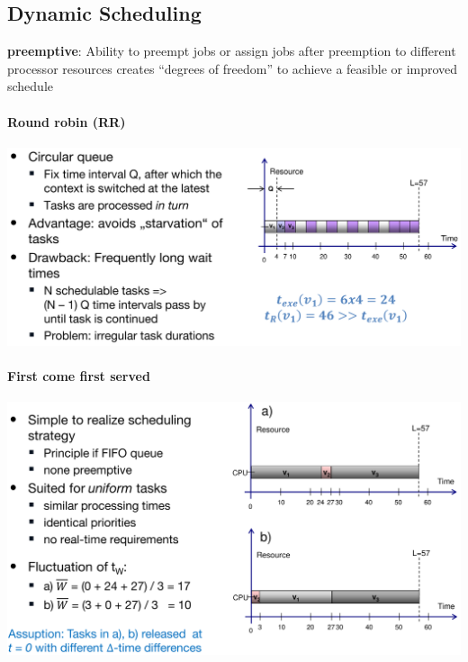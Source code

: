 \documentclass[english]{latex4ei/latex4ei_sheet}
\begin{document}
\subsection{Dynamic Scheduling}

\textbf{preemptive}: Ability to preempt jobs or assign jobs after preemption to different processor resources creates “degrees of freedom” to achieve a feasible or improved schedule

\paragraph{Round robin (RR)}

\begin{center}
  \centering
  \includegraphics[width=\linewidth]{assets/RoundRobin.png}
  \label{fig:roundrobin}
\end{center}


\paragraph{First come first served}
\begin{center}
  \centering
  \includegraphics[width=\linewidth]{assets/FistComeFirstServed.png}
  \label{fig:fistcomefirstserved}
\end{center}
 
\end{document}
